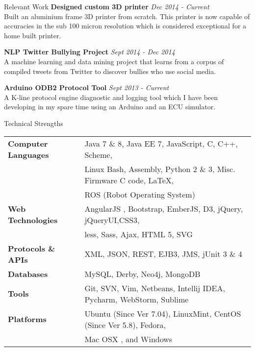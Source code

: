 \documentclass{resume} %
\begin{document}
\begin{rSection}{Relevant Work}
{\bf Designed custom 3D printer} \hfill {\em Dec 2014 - Current} \\ 
Built an aluminium frame 3D printer from scratch. This printer is now capable of accuracies in the sub 100 micron resolution which is considered exceptional for a home built printer.

{\bf NLP Twitter Bullying Project} \hfill {\em Sept 2014 - Dec 2014} \\ 
A machine learning and data mining project that learns from a corpus of compiled tweets from Twitter to discover bullies who use social media.

{\bf Arduino ODB2 Protocol Tool} \hfill {\em Sept 2013 - Current} \\ 
A K-line protocol engine diagnostic and logging tool which I have been developing in my spare time using an Arduino and an ECU simulator.  \smallskip \\

\end{rSection}



\begin{rSection}{Technical Strengths}

\begin{tabular}{ @{} >{\bfseries}l @{\hspace{6ex}} l }
Computer Languages & Java 7 \& 8, Java EE 7, JavaScript, C, C++,  Scheme,\\
 					&  Linux Bash, Assembly, Python 2 \& 3, Misc. Firmware C code, \LaTeX,\\
 					&  ROS (Robot Operating System) \\
Web Technologies & AngularJS , Bootstrap, EmberJS, D3, jQuery, jQueryUI,CSS3,\\
				&  less, Sass, Ajax, HTML 5, SVG \\	
Protocols \& APIs & XML, JSON,  REST, EJB3, JMS, jUnit 3 \& 4 \\
         Databases & MySQL, Derby, Neo4j, MongoDB \\
			 Tools & Git, SVN, Vim, Netbeans, Intellij IDEA, Pycharm, WebStorm, Sublime \\
		 Platforms & Ubuntu (Since Ver 7.04), LinuxMint, CentOS (Since Ver 5.8), Fedora, \\
 & Mac OSX , and Windows \\
\end{tabular}

\end{rSection}
\end{document}

